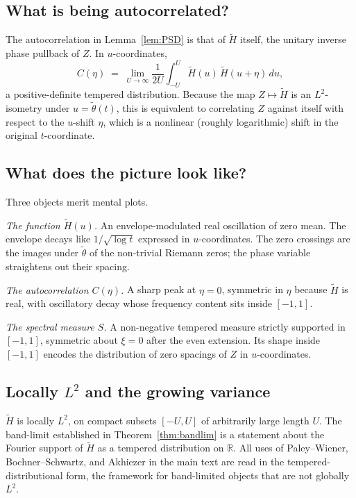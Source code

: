 \documentclass[11pt]{article}
\begin{document}
\subsection{What is being autocorrelated?}\label{app:autocorr}

The autocorrelation in Lemma~\ref{lem:PSD} is that of $\tilde H$ itself, the unitary inverse phase pullback of $Z$. In $u$-coordinates,
\[
C(\eta) \;=\; \lim_{U\to\infty}\frac{1}{2U}\int_{-U}^{U}\tilde H(u)\,\tilde H(u+\eta)\,du,
\]
a positive-definite tempered distribution. Because the map $Z\mapsto\tilde H$ is an $L^2$-isometry under $u=\tilde\theta(t)$, this is equivalent to correlating $Z$ against itself with respect to the $u$-shift $\eta$, which is a nonlinear (roughly logarithmic) shift in the original $t$-coordinate.

\subsection{What does the picture look like?}\label{app:picture}

Three objects merit mental plots.

\emph{The function $\tilde H(u)$.} An envelope-modulated real oscillation of zero mean. The envelope decays like $1/\sqrt{\log t}$ expressed in $u$-coordinates. The zero crossings are the images under $\tilde\theta$ of the non-trivial Riemann zeros; the phase variable straightens out their spacing.

\emph{The autocorrelation $C(\eta)$.} A sharp peak at $\eta=0$, symmetric in $\eta$ because $\tilde H$ is real, with oscillatory decay whose frequency content sits inside $[-1,1]$.

\emph{The spectral measure $S$.} A non-negative tempered measure strictly supported in $[-1,1]$, symmetric about $\xi=0$ after the even extension. Its shape inside $[-1,1]$ encodes the distribution of zero spacings of $Z$ in $u$-coordinates.

\subsection{Locally $L^2$ and the growing variance}\label{app:localL2}

$\tilde H$ is locally $L^2$, on compact subsets $[-U,U]$ of arbitrarily large length $U$. The band-limit established in Theorem~\ref{thm:bandlim} is a statement about the Fourier support of $\tilde H$ as a tempered distribution on $\mathbb{R}$. All uses of Paley--Wiener, Bochner--Schwartz, and Akhiezer in the main text are read in the tempered-distributional form, the framework for band-limited objects that are not globally $L^2$.
\end{document}
